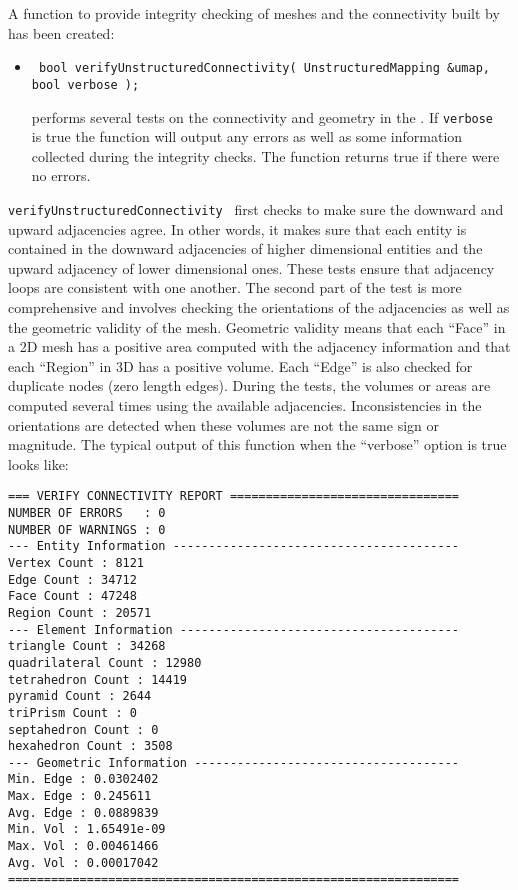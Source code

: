 A function to provide integrity checking of meshes and the connectivity built by \umap has
been created:
\begin{itemize}
\item \begin{verbatim} bool verifyUnstructuredConnectivity( UnstructuredMapping &umap, bool verbose ); \end{verbatim}
performs several tests on the connectivity and geometry in the .  If {\tt verbose }
is true the function will output any errors as well as some information collected during the
integrity checks.  The function returns true if there were no errors.
\end{itemize}

{\tt verifyUnstructuredConnectivity } first checks to make sure the
downward and upward adjacencies agree.  In other words, it makes sure
that each entity is contained in the downward adjacencies of higher
dimensional entities and the upward adjacency of lower dimensional
ones.  These tests ensure that adjacency loops are consistent with one
another.  The second part of the test is more comprehensive and
involves checking the orientations of the adjacencies as well as the
geometric validity of the mesh.  Geometric validity means that each
``Face'' in a 2D mesh has a positive area computed with the adjacency
information and that each ``Region'' in 3D has a positive volume.
Each ``Edge'' is also checked for duplicate nodes (zero length edges).
During the tests, the volumes or areas are computed several times
using the available adjacencies.  Inconsistencies in the orientations
are detected when these volumes are not the same sign or magnitude.
The typical output of this function when the ``verbose'' option is true
looks like:
\begin{verbatim}
=== VERIFY CONNECTIVITY REPORT ================================
NUMBER OF ERRORS   : 0
NUMBER OF WARNINGS : 0
--- Entity Information ----------------------------------------
Vertex Count : 8121
Edge Count : 34712
Face Count : 47248
Region Count : 20571
--- Element Information ---------------------------------------
triangle Count : 34268
quadrilateral Count : 12980
tetrahedron Count : 14419
pyramid Count : 2644
triPrism Count : 0
septahedron Count : 0
hexahedron Count : 3508
--- Geometric Information -------------------------------------
Min. Edge : 0.0302402
Max. Edge : 0.245611
Avg. Edge : 0.0889839
Min. Vol : 1.65491e-09
Max. Vol : 0.00461466
Avg. Vol : 0.00017042
===============================================================
\end{verbatim}

